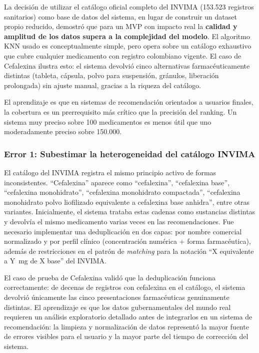 La decisión de utilizar el catálogo oficial completo del INVIMA (153.523 registros sanitarios) como base de datos del sistema, en lugar de construir un dataset propio reducido, demostró que para un MVP con impacto real la \textbf{calidad y amplitud de los datos supera a la complejidad del modelo}. El algoritmo KNN usado es conceptualmente simple, pero opera sobre un catálogo exhaustivo que cubre cualquier medicamento con registro colombiano vigente. El caso de Cefalexina ilustra esto: el sistema devolvió cinco alternativas farmacéuticamente distintas (tableta, cápsula, polvo para suspensión, gránulos, liberación prolongada) sin ajuste manual, gracias a la riqueza del catálogo.

El aprendizaje es que en sistemas de recomendación orientados a usuarios finales, la cobertura es un prerrequisito más crítico que la precisión del ranking. Un sistema muy preciso sobre 100 medicamentos es menos útil que uno moderadamente preciso sobre 150.000.

\subsubsection*{Error 1: Subestimar la heterogeneidad del catálogo INVIMA}

El catálogo del INVIMA registra el mismo principio activo de formas inconsistentes. ``Cefalexina'' aparece como ``cefalexina'', ``cefalexina base'', ``cefalexina monohidrato'', ``cefalexina monohidrato compactada'', ``cefalexina monohidrato polvo liofilizado equivalente a cefalexina base anhidra'', entre otras variantes. Inicialmente, el sistema trataba estas cadenas como sustancias distintas y devolvía el mismo medicamento varias veces en las recomendaciones. Fue necesario implementar una deduplicación en dos capas: por nombre comercial normalizado y por perfil clínico (concentración numérica + forma farmacéutica), además de restricciones en el patrón de \textit{matching} para la notación ``X equivalente a Y~mg de X base'' del INVIMA.

El caso de prueba de Cefalexina validó que la deduplicación funciona correctamente: de decenas de registros con cefalexina en el catálogo, el sistema devolvió únicamente las cinco presentaciones farmacéuticas genuinamente distintas. El aprendizaje es que los datos gubernamentales del mundo real requieren un análisis exploratorio detallado antes de integrarlos en un sistema de recomendación: la limpieza y normalización de datos representó la mayor fuente de errores visibles para el usuario y la mayor parte del tiempo de corrección del sistema.


